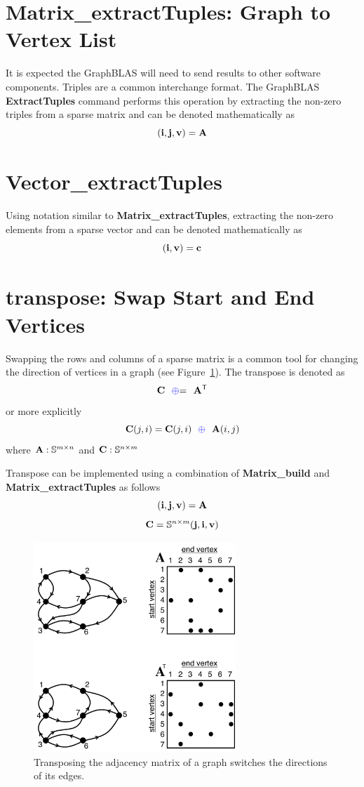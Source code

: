 \section{Matrix\_extractTuples: Graph to Vertex List}
  It is expected the GraphBLAS will need to send results to other software components.  Triples are a common interchange format.  The GraphBLAS {\bf ExtractTuples} command performs this operation by extracting the non-zero triples from a sparse matrix and can be denoted mathematically as
$$
	({\bf i},{\bf j},{\bf v}) = {\bf A}
$$

\section{Vector\_extractTuples}
  Using notation similar to {\bf Matrix\_extractTuples}, extracting the non-zero elements from a sparse vector and can be denoted mathematically as
$$
	({\bf i},{\bf v}) = {\bf c}
$$

\section{transpose: Swap Start and End Vertices}
  Swapping the rows and columns of a sparse matrix is a common tool for changing the direction of vertices in a graph (see Figure~\ref{fig:AdjacencyMatrixTranspose}).  The transpose is denoted as
$$
     {\bf C} ~~ {\textcolor{blue}{\oplus}}{=} ~~ {\bf A}^{\sf T}
$$   
or more explicitly
$$
     {\bf C}(j,i) = {\bf C}(j,i) ~~ {\textcolor{blue}{\oplus}} ~~ {\bf A}(i,j)
$$   
where ${\bf A}:\mathbb{S}^{m \times n}$ and ${\bf C}:\mathbb{S}^{n \times m}$

Transpose can be implemented using a combination of {\bf Matrix\_build} and {\bf Matrix\_extractTuples} as follows
$$
	({\bf i},{\bf j},{\bf v}) = {\bf A}
$$
$$
   \mathbf{C} = \mathbb{S}^{n \times m}({\bf j},{\bf i},{\bf v})
$$

\begin{figure}[!htb]
  \centering
    \includegraphics[width=3in]{figures/AdjacencyMatrixTranspose.pdf}
      \caption{Transposing the adjacency matrix of a graph switches the directions of its edges.}
      \label{fig:AdjacencyMatrixTranspose}
\end{figure}
  
